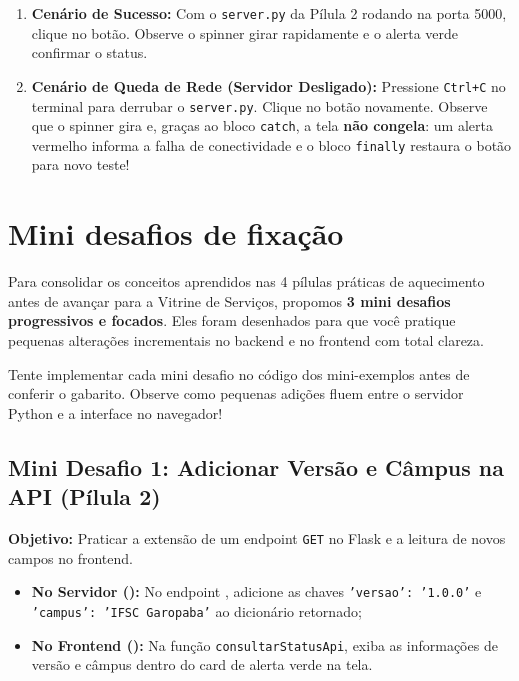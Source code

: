 \begin{boxTeste}
\begin{enumerate}
  \item \textbf{Cenário de Sucesso:} Com o \texttt{server.py} da Pílula 2 rodando na porta 5000, clique no botão. Observe o spinner girar rapidamente e o alerta verde confirmar o status.
  \item \textbf{Cenário de Queda de Rede (Servidor Desligado):} Pressione \texttt{Ctrl+C} no terminal para derrubar o \texttt{server.py}. Clique no botão novamente. Observe que o spinner gira e, graças ao bloco \texttt{catch}, a tela \textbf{não congela}: um alerta vermelho informa a falha de conectividade e o bloco \texttt{finally} restaura o botão para novo teste!
\end{enumerate}
\end{boxTeste}


\section{Mini desafios de fixação}\label{sec:desafios}

Para consolidar os conceitos aprendidos nas 4 pílulas práticas de aquecimento antes de avançar para a Vitrine de Serviços, propomos \textbf{3 mini desafios progressivos e focados}. Eles foram desenhados para que você pratique pequenas alterações incrementais no backend e no frontend com total clareza.

\begin{boxDica}
Tente implementar cada mini desafio no código dos mini-exemplos antes de conferir o gabarito. Observe como pequenas adições fluem entre o servidor Python e a interface no navegador!
\end{boxDica}

\subsection*{\hspace{0.4em}Mini Desafio 1: Adicionar Versão e Câmpus na API (Pílula 2)}
\textbf{Objetivo:} Praticar a extensão de um endpoint \texttt{GET} no Flask e a leitura de novos campos no frontend.
\begin{itemize}
  \item \textbf{No Servidor ():} No endpoint , adicione as chaves \texttt{'versao': '1.0.0'} e \texttt{'campus': 'IFSC Garopaba'} ao dicionário retornado;
  \item \textbf{No Frontend ():} Na função \texttt{consultarStatusApi}, exiba as informações de versão e câmpus dentro do card de alerta verde na tela.
\end{itemize}

